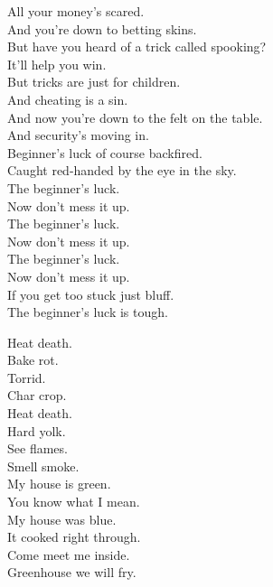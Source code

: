 All your money's scared. \\
And you're down to betting skins. \\
But have you heard of a trick called spooking? \\
It'll help you win. \\
But tricks are just for children. \\
And cheating is a sin. \\
And now you're down to the felt on the table. \\
And security's moving in. \\

Beginner's luck of course backfired. \\
Caught red-handed by the eye in the sky. \\

The beginner's luck. \\
Now don't mess it up. \\
The beginner's luck. \\
Now don't mess it up. \\
The beginner's luck. \\
Now don't mess it up. \\
If you get too stuck just bluff. \\
The beginner's luck is tough. \\





Heat death. \\
Bake rot. \\
Torrid. \\
Char crop. \\
Heat death. \\
Hard yolk. \\
See flames. \\
Smell smoke. \\

My house is green. \\
You know what I mean. \\
My house was blue. \\
It cooked right through. \\

Come meet me inside. \\
Greenhouse we will fry. \\


